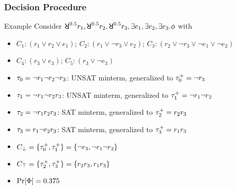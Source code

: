 \begin{frame}
    \frametitle{Decision Procedure}
    \begin{block}{Example}
        Consider $\random{0.5}r_1,\random{0.5}r_2,\random{0.5}r_3,\exists e_1,\exists e_2,\exists e_3.\pf$ with
        \begin{itemize}
            \item[] $C_1: (r_1 \lor r_2 \lor e_1)$; $C_2: (r_1 \lor \lnot r_3 \lor e_2)$; $C_3: (r_2 \lor \lnot r_3 \lor \lnot e_1 \lor \lnot e_2)$
            \item[] $C_4: (r_3 \lor e_3)$; $C_5: (r_3 \lor \lnot e_3)$
                  \pause
        \end{itemize}
        \begin{itemize}
            \item $\tau_0=\lnot r_1 \lnot r_2 \lnot r_3$: UNSAT minterm, generalized to $\tau_0^+=\lnot r_3$
                  \pause
            \item $\tau_1=\lnot r_1 \lnot r_2 r_3$: UNSAT minterm, generalized to $\tau_1^+=\lnot r_1 \lnot r_2$
                  \pause
            \item $\tau_2=\lnot r_1 r_2 r_3$: SAT minterm, generalized to $\tau_2^+=r_2r_3$
                  \pause
            \item $\tau_3=r_1 \lnot r_2 r_3$: SAT minterm, generalized to $\tau_3^+=r_1r_3$
                  \pause
            \item $C_\bot=\{\tau_0^+,\tau_1^+\}=\{\lnot r_3,\lnot r_1 \lnot r_2\}$
                  \pause
            \item $C_\top=\{\tau_2^+,\tau_3^+\}=\{r_2r_3,r_1r_3\}$
                  \pause
            \item $\Pr[\Phi]=0.375$
        \end{itemize}
    \end{block}
\end{frame}